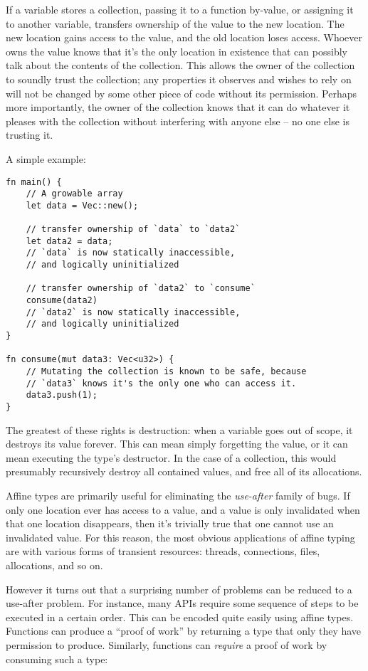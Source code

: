 If a variable stores a collection, passing it to a function by-value, or
assigning it to another variable, transfers ownership of the value to the new
location. The new location gains access to the value, and the old location loses
access. Whoever owns the value knows that it's the only location
in existence that can possibly talk about the contents of the collection.
This allows the owner of the collection to soundly trust the
collection; any properties it observes and wishes to rely on will not be changed
by some other piece of code without its permission. Perhaps more importantly,
the owner of the collection knows that it can do whatever it pleases with the
collection without interfering with anyone else -- no one else is trusting it.

A simple example:

\begin{verbatim}
fn main() {
    // A growable array
    let data = Vec::new();

    // transfer ownership of `data` to `data2`
    let data2 = data;
    // `data` is now statically inaccessible,
    // and logically uninitialized

    // transfer ownership of `data2` to `consume`
    consume(data2)
    // `data2` is now statically inaccessible,
    // and logically uninitialized
}

fn consume(mut data3: Vec<u32>) {
    // Mutating the collection is known to be safe, because
    // `data3` knows it's the only one who can access it.
    data3.push(1);
}
\end{verbatim}

The greatest of these rights is destruction: when a variable goes out of scope,
it destroys its value forever. This can mean simply forgetting the value,
or it can mean executing the type's destructor. In the case of a collection,
this would presumably recursively destroy all contained values, and free all of
its allocations.

Affine types are primarily useful for eliminating the \emph{use-after} family of bugs.
If only one location ever has access to a value, and a value is only invalidated
when that one location disappears, then it's trivially true that one cannot use
an invalidated value. For this reason, the most obvious applications of affine
typing are with various forms of transient resources: threads, connections,
files, allocations, and so on.

However it turns out that a surprising number of problems can be reduced to a
use-after problem. For instance, many APIs require some sequence of steps to
be executed in a certain order. This can be encoded quite easily using affine
types. Functions can produce a ``proof of work'' by returning a type that only
they have permission to produce. Similarly, functions can \emph{require} a proof
of work by consuming such a type:

